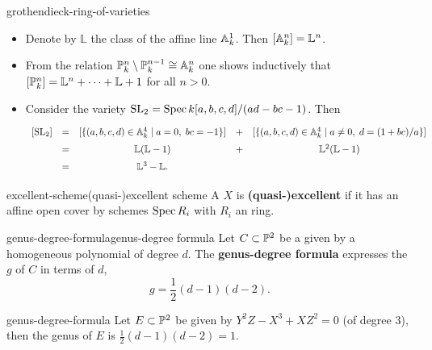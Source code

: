 \begin{example}{grothendieck-ring-of-varieties}
    \begin{itemize}
        \item Denote by $\mathbb{L}$ the class of the affine line $\AA^1_k$. Then $[\AA^n_k] = \mathbb{L}^n$.
        \item From the relation $\PP^n_k \setminus \PP^{n - 1}_k \cong \AA^n_k$ one shows inductively that $[\PP^n_k] = \mathbb{L}^n + \cdots + \mathbb{L} + 1$ for all $n > 0$.
        \item Consider the variety $\textup{SL}_2 = \Spec k[a, b, c, d] / (ad - bc - 1)$. Then
        \[ \def\arraystretch{1.5}
        \begin{array}{ccccc}
            [\textup{SL}_2] & = & [\{ (a, b, c, d) \in \AA^4_k \mid a = 0, \; bc = -1 \}] & + & [\{ (a, b, c, d) \in \AA^4_k \mid a \ne 0, \; d = (1 + bc) / a \}] \\
                & = & \mathbb{L} (\mathbb{L} - 1) & + & \mathbb{L}^2 (\mathbb{L} - 1) \\
                & = & \mathbb{L}^3 - \mathbb{L} . &
        \end{array} \]
    \end{itemize}
    
\end{example}

\begin{topic}{excellent-scheme}{(quasi-)excellent scheme}
    A  $X$ is \textbf{(quasi-)excellent} if it has an affine open cover by schemes $\Spec R_i$ with $R_i$ an  ring.
\end{topic}

\begin{topic}{genus-degree-formula}{genus-degree formula}
    Let $C \subset \PP^2$ be a    given by a homogeneous polynomial of degree $d$. The \textbf{genus-degree formula} expresses the  $g$ of $C$ in terms of $d$,
    \[ g = \frac{1}{2}(d - 1)(d - 2) . \]
\end{topic}

\begin{example}{genus-degree-formula}
    Let $E \subset \PP^2$ be given by $Y^2Z - X^3 + XZ^2 = 0$ (of degree $3$), then the genus of $E$ is $\frac{1}{2}(d - 1)(d - 2) = 1$.
\end{example}


